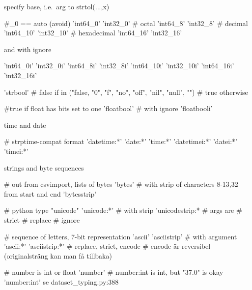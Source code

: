 specify base, i.e.\ arg to strtol(...,x)
\\
\begin{python}
#_0 == auto (avoid)
    'int64_0'      
    'int32_0'      
# octal
    'int64_8'      
    'int32_8'      
# decimal
    'int64_10'     
    'int32_10'     
# hexadecimal
    'int64_16'     
    'int32_16'     
\end{python}

and with ignore
\\
\begin{python}
    'int64_0i'     
    'int32_0i'     
    'int64_8i'     
    'int32_8i'     
    'int64_10i'    
    'int32_10i'    
    'int64_16i'    
    'int32_16i'    
\end{python}

\begin{python}
'strbool'
# false if in ("false, "0", "f", "no", "off", "nil", "null", "")
# true  otherwise
\end{python}

\begin{python}
#true if float has bits set to one
'floatbool'
# with ignore
'floatbooli'   
\end{python}

time and date
\\
\begin{python}
# strptime-compat format
    'datetime:*'   
    'date:*'       
    'time:*'       
    'datetimei:*'  
    'datei:*'      
    'timei:*'      
\end{python}

strings and byte sequences
\\
\begin{python}
# out from csvimport, lists of bytes
'bytes'
# with strip of characters 8-13,32 from start and end
'bytesstrip'
\end{python}

\begin{python}
# python type "unicode"
'unicode:*'    
# with strip
'unicodestrip:*
# args are
#   strict
#   replace
#   ignore
\end{python}

\begin{python}
# sequence of letters, 7-bit representation
    'ascii'        
    'asciistrip'   
# with argument
    'ascii:*'      
    'asciistrip:*' 
# replace, strict, encode
# encode är reversibel (originalsträng kan man få tillbaka)
\end{python}

\begin{python}
# number is int or float
    'number'       
# number:int is int, but "37.0" is okay
    'number:int'  se dataset_typing.py:388
\end{python}



